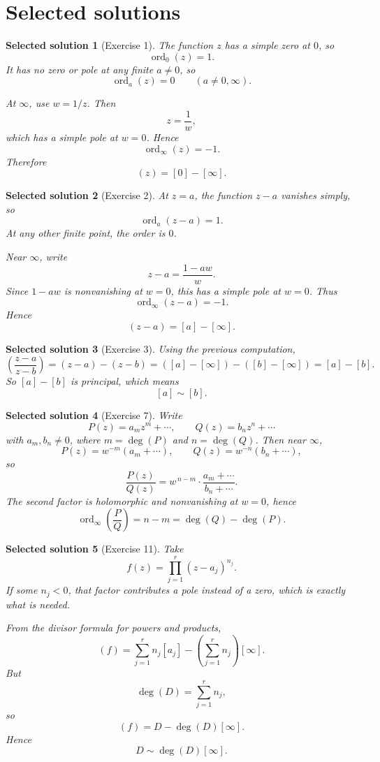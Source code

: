 \documentclass[11pt]{article}
\newtheorem*{solution}{Selected solution}
\newcommand{\ord}{\operatorname{ord}}
\begin{document}
	\section*{Selected solutions}
	
	\begin{solution}[Exercise 1]
		The function \(z\) has a simple zero at \(0\), so
		\[
		\ord_0(z)=1.
		\]
		It has no zero or pole at any finite \(a\neq 0\), so
		\[
		\ord_a(z)=0 \qquad (a\neq 0,\infty).
		\]
		
		At \(\infty\), use \(w=1/z\). Then
		\[
		z=\frac{1}{w},
		\]
		which has a simple pole at \(w=0\). Hence
		\[
		\ord_\infty(z)=-1.
		\]
		Therefore
		\[
		(z)=[0]-[\infty].
		\]
	\end{solution}
	
	\begin{solution}[Exercise 2]
		At \(z=a\), the function \(z-a\) vanishes simply, so
		\[
		\ord_a(z-a)=1.
		\]
		At any other finite point, the order is \(0\).
		
		Near \(\infty\), write
		\[
		z-a=\frac{1-aw}{w}.
		\]
		Since \(1-aw\) is nonvanishing at \(w=0\), this has a simple pole at \(w=0\). Thus
		\[
		\ord_\infty(z-a)=-1.
		\]
		Hence
		\[
		(z-a)=[a]-[\infty].
		\]
	\end{solution}
	
	\begin{solution}[Exercise 3]
		Using the previous computation,
		\[
		\left(\frac{z-a}{z-b}\right)=(z-a)-(z-b)=([a]-[\infty])-([b]-[\infty])=[a]-[b].
		\]
		So \([a]-[b]\) is principal, which means
		\[
		[a]\sim [b].
		\]
	\end{solution}
	
	\begin{solution}[Exercise 7]
		Write
		\[
		P(z)=a_m z^m+\cdots,\qquad Q(z)=b_n z^n+\cdots
		\]
		with \(a_m,b_n\neq 0\), where \(m=\deg(P)\) and \(n=\deg(Q)\).
		Then near \(\infty\),
		\[
		P(z)=w^{-m}(a_m+\cdots),\qquad Q(z)=w^{-n}(b_n+\cdots),
		\]
		so
		\[
		\frac{P(z)}{Q(z)}=w^{\,n-m}\cdot \frac{a_m+\cdots}{b_n+\cdots}.
		\]
		The second factor is holomorphic and nonvanishing at \(w=0\), hence
		\[
		\ord_\infty\!\left(\frac{P}{Q}\right)=n-m=\deg(Q)-\deg(P).
		\]
	\end{solution}
	
	\begin{solution}[Exercise 11]
		Take
		\[
		f(z)=\prod_{j=1}^r (z-a_j)^{n_j}.
		\]
		If some \(n_j<0\), that factor contributes a pole instead of a zero, which is exactly what is needed.
		
		From the divisor formula for powers and products,
		\[
		(f)=\sum_{j=1}^r n_j[a_j]-\left(\sum_{j=1}^r n_j\right)[\infty].
		\]
		But
		\[
		\deg(D)=\sum_{j=1}^r n_j,
		\]
		so
		\[
		(f)=D-\deg(D)[\infty].
		\]
		Hence
		\[
		D\sim \deg(D)[\infty].
		\]
	\end{solution}
	
\end{document}
